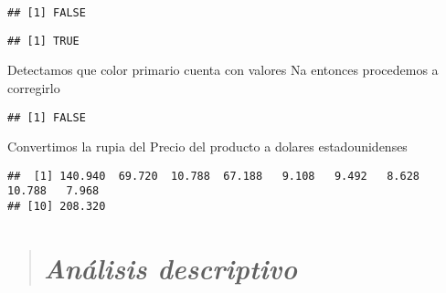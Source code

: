 \documentclass[
]{article}
\newenvironment{Shaded}{\begin{snugshade}}{\end{snugshade}}
\newcommand{\DecValTok}[1]{\textcolor[rgb]{0.00,0.00,0.81}{#1}}
\newcommand{\FloatTok}[1]{\textcolor[rgb]{0.00,0.00,0.81}{#1}}
\newcommand{\FunctionTok}[1]{\textcolor[rgb]{0.00,0.00,0.00}{#1}}
\newcommand{\NormalTok}[1]{#1}
\newcommand{\OtherTok}[1]{\textcolor[rgb]{0.56,0.35,0.01}{#1}}
\newcommand{\SpecialCharTok}[1]{\textcolor[rgb]{0.00,0.00,0.00}{#1}}
\newcommand{\StringTok}[1]{\textcolor[rgb]{0.31,0.60,0.02}{#1}}
\begin{document}
\begin{verbatim}
## [1] FALSE
\end{verbatim}

\begin{Shaded}
\end{Shaded}

\begin{verbatim}
## [1] TRUE
\end{verbatim}

Detectamos que color primario cuenta con valores Na entonces procedemos
a corregirlo

\begin{Shaded}
\end{Shaded}

\begin{verbatim}
## [1] FALSE
\end{verbatim}

Convertimos la rupia del Precio del producto a dolares estadounidenses

\begin{Shaded}
\end{Shaded}

\begin{verbatim}
##  [1] 140.940  69.720  10.788  67.188   9.108   9.492   8.628  10.788   7.968
## [10] 208.320
\end{verbatim}

\begin{quote}
\hypertarget{anuxe1lisis-descriptivo}{%
\section{\texorpdfstring{\textbf{\emph{Análisis
descriptivo}}}{Análisis descriptivo}}\label{anuxe1lisis-descriptivo}}
\end{quote}
\end{document}
